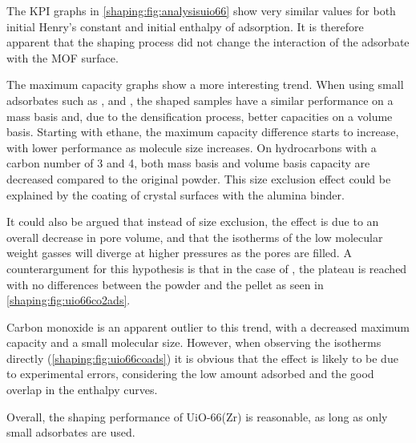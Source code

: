 The KPI graphs in \autoref{shaping:fig:analysisuio66} show very
similar values for both initial Henry's constant and initial
enthalpy of adsorption. It is therefore apparent that the shaping process
did not change the interaction of the adsorbate with the MOF surface.

The maximum capacity graphs show a more interesting trend.
When using small adsorbates such as ,  and ,
the shaped samples have a similar performance on a mass basis and,
due to the densification process, better capacities on a volume
basis. Starting with ethane, the maximum capacity difference starts
to increase, with lower performance as molecule size increases.
On hydrocarbons with a carbon number of 3 and 4, both mass basis and
volume basis capacity are decreased compared to the original powder.
This size exclusion effect could be explained by the coating of
crystal surfaces with the alumina binder.

It could also be argued that instead of size exclusion, the effect is due to
an overall decrease in pore volume, and that the isotherms of the
low molecular weight gasses will diverge at higher pressures
as the pores are filled. A counterargument for this hypothesis is that
in the case of , the plateau is reached with no differences
between the powder and the pellet as seen
in \autoref{shaping:fig:uio66co2ads}.

Carbon monoxide is an apparent outlier to this trend, with a
decreased maximum capacity and a small molecular size.
However, when observing the isotherms directly
(\autoref{shaping:fig:uio66coads}) it is obvious that the effect is
likely to be due to experimental errors, considering
the low amount adsorbed and the good overlap in the enthalpy
curves.

Overall, the shaping performance of UiO-66(Zr) is
reasonable, as long as only small adsorbates are used.
